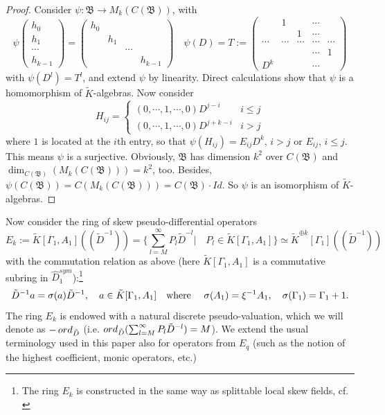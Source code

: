 \documentclass[11pt]{article}
\theoremstyle{definition}
\newcommand{\ord}{\mathop{\rm ord}\nolimits}
\theoremstyle{plain}
\numberwithin{equation}{section}
\begin{document}
\begin{proof}
	Consider $\psi:\mathfrak{B}\rightarrow M_k(C(\mathfrak{B}))$, with 
	$$
	\psi\begin{pmatrix}
		h_0 \\
		h_1 \\
		\cdots \\
		h_{k-1}
	\end{pmatrix}=\begin{pmatrix}
	h_0 &  &  &  \\
	& h_1 &  &  \\
	&  & \cdots &  \\
	&  &  & h_{k-1}
	\end{pmatrix}\quad \psi(D)=T:=\begin{pmatrix}
	& 1 &  & \cdots &  \\
	&  & 1 & \cdots &  \\
	\cdots & \cdots & \cdots & \cdots & \cdots \\
	&  &  & \cdots & 1 \\
	D^k &  &  & \cdots & 
	\end{pmatrix}
	$$
	with $\psi(D^l)=T^l$, and extend $\psi$ by linearity. Direct calculations show that $\psi$ is a homomorphism of $\tilde{K}$-algebras. Now consider 
	$$
	H_{ij}=\begin{cases}
		(0,\cdots,1,\cdots,0)D^{j-i}&i\leq j
		\\(0,\cdots,1,\cdots,0)D^{j+k-i}&i>j
	\end{cases}
	$$  
	where $1$ is located at the $i$th entry, so that $\psi(H_{ij})=E_{ij}D^k$, $i>j$ or $E_{ij}$, $i\le j$. This means $\psi$ is a surjective. Obviously, $\mathfrak{B}$ has  dimension $k^2$ over $C(\mathfrak{B})$ and $\dim_{C(\mathfrak{B})}(M_k(C(\mathfrak{B})))=k^2$, too. Besides, $\psi (C(\mathfrak{B}))=C(M_k(C(\mathfrak{B})))= C(\mathfrak{B})\cdot Id$. So  $\psi$ is an isomorphism of $\tilde{K}$-algebras.
\end{proof}

Now consider the ring of skew pseudo-differential operators 
$$
E_k:=\tilde{K}[\Gamma_1, A_1]((\tilde{D}^{-1}))=\{\sum_{l=M}^{\infty}P_l\tilde{D}^{-l} | \quad P_l\in \tilde{K}[\Gamma_1, A_1]\} \simeq \tilde{K}^{\oplus k}[\Gamma_1]((\tilde{D}^{-1}))
$$
with the commutation relation as above (here $\tilde{K}[\Gamma_1, A_1]$ is a commutative subring in $\hat{D}_1^{sym}$):\footnote{The ring $E_k$ is constructed in the same way as splittable  local skew fields, cf. \cite{Zheglov_izv}}
$$
\tilde{D}^{-1}a=\sigma (a)\tilde{D}^{-1}, \quad a\in \tilde{K}[\Gamma_1, A_1] \quad \mbox{where \quad }
\sigma (A_1)= \xi^{-1} A_1, \quad \sigma (\Gamma_1)=\Gamma_1+1.
$$
The ring $E_k$ is endowed with a natural discrete pseudo-valuation, which we will denote as $-\ord_{\tilde{D}}$ (i.e. $\ord_{\tilde{D}}(\sum_{l=M}^{\infty}P_l\tilde{D}^{-l})= M$).  We extend the usual terminology used in this paper also for operators from $E_q$ (such as the notion of the highest coefficient, monic operators, etc.)
\end{document}
